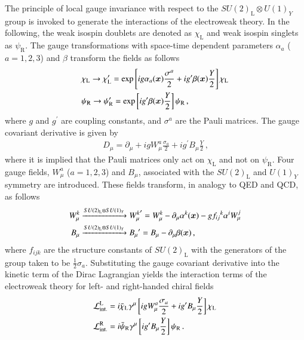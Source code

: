 The principle of local gauge invariance with respect to the
$SU(2)_{\text{L}} \otimes U(1)_Y$ group is invoked to generate the interactions
of the electroweak theory. In the following, the weak isospin doublets are
denoted as $\chi_{\text{L}}$ and weak isospin singlets as $\psi_{\text{R}}$. The
gauge transformations with space-time dependent parameters $\alpha_a$
($a = 1, 2, 3$) and $\beta$ transform the fields as follows
\begin{align*}
  &\chi_{\text{L}} \to \chi_{\text{L}}^\prime = \exp\left[ i g \alpha_a(\bm{x}) \frac{\sigma^a}{2} + i g^\prime \beta(\bm{x}) \frac{Y}{2} \right] \chi_{\text{L}} \\
  &\psi_{\text{R}} \to \psi_{\text{R}}^\prime = \exp\left[ i g^\prime \beta(\bm{x}) \frac{Y}{2} \right] \psi_{\text{R}} \,\text{,}
\end{align*}
where $g$ and $g^\prime$ are coupling constants, and $\sigma^a$ are the Pauli
matrices. The gauge covariant derivative is given by
\begin{align*}
  D_\mu = \partial_\mu
  + i g W^a_\mu \frac{\sigma_a}{2}
  + i g^\prime B_\mu \frac{Y}{2} \,\text{,}
\end{align*}
where it is implied that the Pauli matrices only act on $\chi_{\text{L}}$ and
not on $\psi_{\text{R}}$. Four gauge fields, $W_\mu^a$ ($a = 1, 2, 3$) and
$B_\mu$, associated with the $SU(2)_{\text{L}}$ and $U(1)_Y$ symmetry are
introduced. These fields transform, in analogy to QED and QCD, as follows
\begin{align*}
  W_\mu^k &\xrightarrow{SU(2)_{\text{L}} \otimes SU(1)_Y} {W_\mu^k}^\prime = W_\mu^k - \partial_\mu \alpha^{k}(\bm{x}) - g {f_{ij}}^k \alpha^{i} W_\mu^j \\
  B_\mu   &\xrightarrow{SU(2)_{\text{L}} \otimes SU(1)_Y} {B_\mu}^\prime = B_\mu - \partial_\mu \beta(\bm{x}) \,\text{,}
\end{align*}
where $f_{ijk}$ are the structure constants of $SU(2)_{\text{L}}$ with the
generators of the group taken to be $\frac{1}{2} \sigma_a$.  Substituting the
gauge covariant derivative into the kinetic term of the Dirac Lagrangian yields
the interaction terms of the electroweak theory for left- and right-handed
chiral fields
\begin{align}
  &\mathcal{L}_{\text{int.}}^{\text{L}} = i \bar{\chi}_{\text{L}} \gamma^\mu \left[i g W_\mu^a \frac{\sigma_a}{2} + i g^\prime B_\mu \frac{Y}{2} \right] \chi_{\text{L}} \label{eq:theory_electroweak_left} \\
  &\mathcal{L}_{\text{int.}}^{\text{R}} = i \bar{\psi}_{\text{R}} \gamma^\mu \left[i g^\prime B_\mu \frac{Y}{2} \right] \psi_{\text{R}} \,\text{.} \label{eq:theory_electroweak_right}
\end{align}
